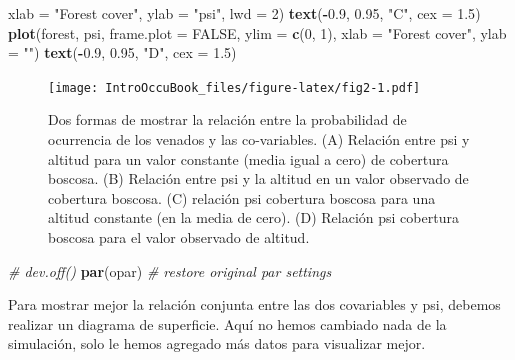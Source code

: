 \documentclass[
]{book}
\newenvironment{Shaded}{\begin{snugshade}}{\end{snugshade}}
\newcommand{\CommentTok}[1]{\textcolor[rgb]{0.56,0.35,0.01}{\textit{#1}}}
\newcommand{\DataTypeTok}[1]{\textcolor[rgb]{0.13,0.29,0.53}{#1}}
\newcommand{\DecValTok}[1]{\textcolor[rgb]{0.00,0.00,0.81}{#1}}
\newcommand{\FloatTok}[1]{\textcolor[rgb]{0.00,0.00,0.81}{#1}}
\newcommand{\KeywordTok}[1]{\textcolor[rgb]{0.13,0.29,0.53}{\textbf{#1}}}
\newcommand{\NormalTok}[1]{#1}
\newcommand{\OperatorTok}[1]{\textcolor[rgb]{0.81,0.36,0.00}{\textbf{#1}}}
\newcommand{\OtherTok}[1]{\textcolor[rgb]{0.56,0.35,0.01}{#1}}
\newcommand{\StringTok}[1]{\textcolor[rgb]{0.31,0.60,0.02}{#1}}
\begin{document}
\begin{Shaded}
\begin{Highlighting}[]
      \DataTypeTok{xlab =} \StringTok{"Forest cover"}\NormalTok{, }\DataTypeTok{ylab =} \StringTok{"psi"}\NormalTok{, }\DataTypeTok{lwd =} \DecValTok{2}\NormalTok{)}
\KeywordTok{text}\NormalTok{(}\OperatorTok{-}\FloatTok{0.9}\NormalTok{, }\FloatTok{0.95}\NormalTok{, }\StringTok{"C"}\NormalTok{, }\DataTypeTok{cex =} \FloatTok{1.5}\NormalTok{)}
\KeywordTok{plot}\NormalTok{(forest, psi, }\DataTypeTok{frame.plot =} \OtherTok{FALSE}\NormalTok{, }\DataTypeTok{ylim =} \KeywordTok{c}\NormalTok{(}\DecValTok{0}\NormalTok{, }\DecValTok{1}\NormalTok{), }\DataTypeTok{xlab =} \StringTok{"Forest cover"}\NormalTok{, }\DataTypeTok{ylab =} \StringTok{""}\NormalTok{)}
\KeywordTok{text}\NormalTok{(}\OperatorTok{-}\FloatTok{0.9}\NormalTok{, }\FloatTok{0.95}\NormalTok{, }\StringTok{"D"}\NormalTok{, }\DataTypeTok{cex =} \FloatTok{1.5}\NormalTok{)}
\end{Highlighting}
\end{Shaded}

\begin{figure}
\centering
\texttt{[image: IntroOccuBook\_files/figure-latex/fig2-1.pdf]}
\caption{\label{fig:fig2}Dos formas de mostrar la relación entre la probabilidad de ocurrencia de los venados y las co-variables. (A) Relación entre psi y altitud para un valor constante (media igual a cero) de cobertura boscosa. (B) Relación entre psi y la altitud en un valor observado de cobertura boscosa. (C) relación psi cobertura boscosa para una altitud constante (en la media de cero). (D) Relación psi cobertura boscosa para el valor observado de altitud.}
\end{figure}

\begin{Shaded}
\begin{Highlighting}[]
\CommentTok{# dev.off()}
\KeywordTok{par}\NormalTok{(opar)          }\CommentTok{# restore original par settings}
\end{Highlighting}
\end{Shaded}

Para mostrar mejor la relación conjunta entre las dos covariables y psi, debemos realizar un diagrama de superficie. Aquí no hemos cambiado nada de la simulación, solo le hemos agregado más datos para visualizar mejor.
\end{document}
